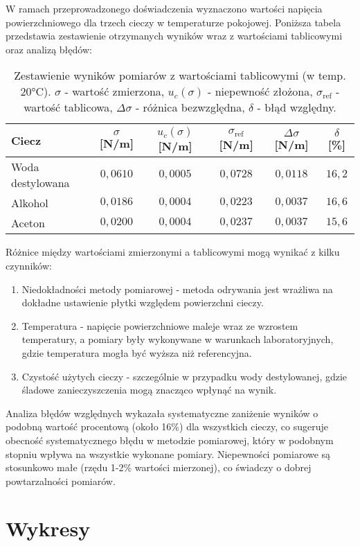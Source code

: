 \documentclass[a4paper,12pt]{article}
\begin{document}
W ramach przeprowadzonego doświadczenia wyznaczono wartości napięcia powierzchniowego dla trzech cieczy w temperaturze pokojowej. Poniższa tabela przedstawia zestawienie otrzymanych wyników wraz z wartościami tablicowymi oraz analizą błędów:

\begin{table}[H]
    \centering
    \begin{tabular}{|l|c|c|c|c|c|}
        \hline
        \textbf{Ciecz} & \textbf{$\sigma$ [N/m]} & \textbf{$u_c(\sigma)$ [N/m]} & \textbf{$\sigma_{\text{ref}}$ [N/m]} & \textbf{$\Delta\sigma$ [N/m]} & \textbf{$\delta$ [\%]} \\
        \hline
        Woda destylowana & $0{,}0610$ & $0{,}0005$ & $0{,}0728$ & $0{,}0118$ & $16{,}2$ \\
        \hline
        Alkohol & $0{,}0186$ & $0{,}0004$ & $0{,}0223$ & $0{,}0037$ & $16{,}6$ \\
        \hline
        Aceton & $0{,}0200$ & $0{,}0004$ & $0{,}0237$ & $0{,}0037$ & $15{,}6$ \\
        \hline
    \end{tabular}
    \caption{Zestawienie wyników pomiarów z wartościami tablicowymi (w temp. 20°C). $\sigma$ - wartość zmierzona, $u_c(\sigma)$ - niepewność złożona, $\sigma_{\text{ref}}$ - wartość tablicowa, $\Delta\sigma$ - różnica bezwzględna, $\delta$ - błąd względny.}
    \label{tab:wyniki_koncowe}
\end{table}

Różnice między wartościami zmierzonymi a tablicowymi mogą wynikać z kilku czynników:

\begin{enumerate}
    \item Niedokładności metody pomiarowej - metoda odrywania jest wrażliwa na dokładne ustawienie płytki względem powierzchni cieczy.
    \item Temperatura - napięcie powierzchniowe maleje wraz ze wzrostem temperatury, a pomiary były wykonywane w warunkach laboratoryjnych, gdzie temperatura mogła być wyższa niż referencyjna.
    \item Czystość użytych cieczy - szczególnie w przypadku wody destylowanej, gdzie śladowe zanieczyszczenia mogą znacząco wpłynąć na wynik.
\end{enumerate}

Analiza błędów względnych wykazała systematyczne zaniżenie wyników o podobną wartość procentową (około 16\%) dla wszystkich cieczy, co sugeruje obecność systematycznego błędu w metodzie pomiarowej, który w podobnym stopniu wpływa na wszystkie wykonane pomiary. Niepewności pomiarowe są stosunkowo małe (rzędu 1-2\% wartości mierzonej), co świadczy o dobrej powtarzalności pomiarów.

\section{Wykresy}



\end{document}
